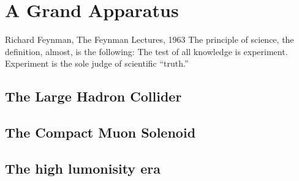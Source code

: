 \chapter{A Grand Apparatus}
\begin{aquote}{Richard Feynman, The Feynman Lectures, 1963}
The principle of science, the definition, almost, is the following: The test of all knowledge is experiment. 
Experiment is the sole judge of scientific ``truth.''
\end{aquote}
\section{The Large Hadron Collider}
\section{The Compact Muon Solenoid}
\section{The high lumonisity era}
